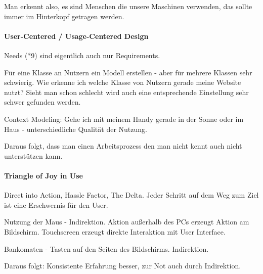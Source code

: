 Man erkennt also, es sind Menschen die unsere Maschinen verwenden, das sollte immer
im Hinterkopf getragen werden.

\paragraph{User-Centered / Usage-Centered Design}

Needs (*9) sind eigentlich auch nur Requirements.

Für eine Klasse an Nutzern ein Modell erstellen - aber für mehrere Klassen sehr 
schwierig. Wie erkenne ich welche Klasse von Nutzern gerade meine Website nutzt?
Sieht man schon schlecht wird auch eine entsprechende Einstellung sehr schwer
gefunden werden.

Context Modeling: Gehe ich mit meinem Handy gerade in der Sonne oder im Haus - 
unterschiedliche Qualität der Nutzung.

\noindent{}

Daraus folgt, dass man einen Arbeitsprozess den man nicht kennt auch nicht
unterstützen kann.

\paragraph{Triangle of Joy in Use}

Direct into Action, Hassle Factor, The Delta. Jeder Schritt auf dem Weg zum Ziel
ist eine Erschwernis für den User.

Nutzung der Maus - Indirektion. Aktion außerhalb des PCs erzeugt Aktion am Bildschirm.
Touchscreen erzeugt direkte Interaktion mit User Interface.

Bankomaten - Tasten auf den Seiten des Bildschirms. Indirektion. 

\noindent{}

Daraus folgt: Konsistente Erfahrung besser, zur Not auch durch Indirektion.
